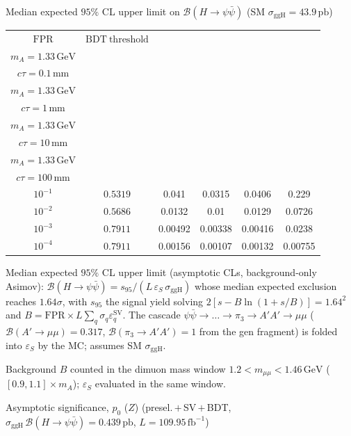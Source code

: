 \documentclass[10pt,a4paper]{article}
\begin{document}
{\vspace{12pt}

Median expected $95\%$ CL upper limit on $\mathcal{B}(H\to\psi\bar{\psi})$ (SM $\sigma_{\mathrm{ggH}}=43.9\,\mathrm{pb}$)

\begin{tabular}{cccccc}
\toprule
$\mathrm{FPR}$ & $\mathrm{BDT\ threshold}$ & \shortstack{$m_{\pi}=4\,\mathrm{GeV}$\\$m_{A}=1.33\,\mathrm{GeV}$\\$c\tau=0.1\,\mathrm{mm}$} & \shortstack{$m_{\pi}=4\,\mathrm{GeV}$\\$m_{A}=1.33\,\mathrm{GeV}$\\$c\tau=1\,\mathrm{mm}$} & \shortstack{$m_{\pi}=4\,\mathrm{GeV}$\\$m_{A}=1.33\,\mathrm{GeV}$\\$c\tau=10\,\mathrm{mm}$} & \shortstack{$m_{\pi}=4\,\mathrm{GeV}$\\$m_{A}=1.33\,\mathrm{GeV}$\\$c\tau=100\,\mathrm{mm}$} \\
\midrule
$10^{-1}$ & $0.5319$ & 0.041 & 0.0315 & 0.0406 & 0.229\\
$10^{-2}$ & $0.5686$ & 0.0132 & 0.01 & 0.0129 & 0.0726\\
$10^{-3}$ & $0.7911$ & 0.00492 & 0.00338 & 0.00416 & 0.0238\\
$10^{-4}$ & $0.7911$ & 0.00156 & 0.00107 & 0.00132 & 0.00755\\
\bottomrule
\end{tabular}

{\small Median expected $95\%$ CL upper limit (asymptotic CLs, background-only Asimov): $\mathcal{B}(H\to\psi\bar{\psi})=s_{95}/(L\,\varepsilon_S\,\sigma_{\mathrm{ggH}})$ whose median expected exclusion reaches $1.64\sigma$, with $s_{95}$ the signal yield solving $2[s-B\ln(1{+}s/B)]=1.64^2$ and $B=\mathrm{FPR}\times L\sum_q\sigma_q\varepsilon_q^{\mathrm{SV}}$. The cascade $\psi\bar{\psi}\to\ldots\to\pi_3\to A'A'\to\mu\mu$ ($\mathcal{B}(A'\to\mu\mu)=0.317$, $\mathcal{B}(\pi_3\to A'A')=1$ from the gen fragment) is folded into $\varepsilon_S$ by the MC; assumes SM $\sigma_{\mathrm{ggH}}$.}

{\small Background $B$ counted in the dimuon mass window $1.2<m_{\mu\mu}<1.46\,\mathrm{GeV}$ ($[0.9,1.1]\times m_A$); $\varepsilon_S$ evaluated in the same window.}

\vspace{12pt}

Asymptotic significance, $p_0$ ($Z$) (presel.\,$+$\,SV\,$+$\,BDT, $\sigma_{\mathrm{ggH}}\,\mathcal{B}(H\to\psi\bar{\psi})=0.439\,\mathrm{pb}$, $L=109.95\,\mathrm{fb}^{-1}$)

}
\end{document}

